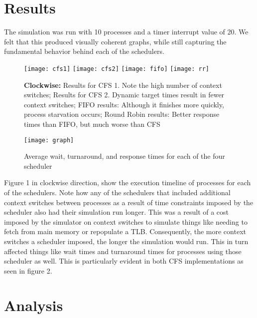 \documentclass[a4paper]{article}
\begin{document}
\section{Results}
\label{sec:results}
The simulation was run with 10 processes and a timer interrupt value of 20. We felt that this produced visually coherent graphs, while still capturing the fundamental behavior behind each of the schedulers.
\begin{figure}[!htb]
\begin{center}
\texttt{[image: cfs1]}
\texttt{[image: cfs2]}
\texttt{[image: fifo]}
\texttt{[image: rr]}
\end{center}
\caption{\textbf{Clockwise: }Results for CFS 1. Note the high number of context switches; Results for CFS 2. Dynamic target times result in fewer context switches; FIFO results: Although it finishes more quickly, process starvation occurs; Round Robin results: Better response times than FIFO, but much worse than CFS}
\end{figure}


\begin{figure}[!htb]
\begin{center}
\texttt{[image: graph]}
\end{center}
\caption{Average wait, turnaround, and response times for each of the four scheduler}
\end{figure}

Figure 1 in clockwise direction, show the execution timeline of processes for each of the schedulers. Note how any of the schedulers that included additional context switches between processes as a result of time constraints imposed by the scheduler also had their simulation run longer. This was a result of a cost imposed by the simulator on context switches to simulate things like needing to fetch from main memory or repopulate a TLB. Consequently, the more context switches a scheduler imposed, the longer the simulation would run. This in turn affected things like wait times and turnaround times for processes using those scheduler as well. This is particularly evident in both CFS implementations as seen in figure 2.

\section{Analysis}
\label{sec:analysis}
\end{document}
